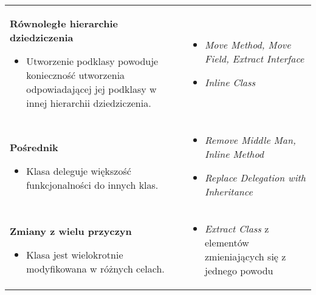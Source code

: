\documentclass[../main.tex]{subfiles}
\begin{document}
\begin{table}[H]
\begin{center}
\begin{tabular}{ p{.35\linewidth} p{.65\linewidth}}
                \cmidrule(r){1-1}\cmidrule(l){2-2}
                \textbf{Równoległe hierarchie dziedziczenia}
                \begin{itemize}
                    \item Utworzenie podklasy powoduje konieczność utworzenia odpowiadającej jej podklasy
                    w innej hierarchii dziedziczenia.
                \end{itemize}
                &
                \begin{itemize}
                    \item \textit{Move Method, Move Field, Extract Interface}
                    \item \textit{Inline Class}
                \end{itemize}
                \\

                \cmidrule(r){1-1}\cmidrule(l){2-2}
                \textbf{Pośrednik}
                \begin{itemize}
                    \item Klasa deleguje większość funkcjonalności do innych klas.
                \end{itemize}
                &
                \begin{itemize}
                    \item \textit{Remove Middle Man, Inline Method}
                    \item \textit{Replace Delegation with Inheritance}
                \end{itemize}
                \\

                \cmidrule(r){1-1}\cmidrule(l){2-2}
                \textbf{Zmiany z wielu przyczyn}
                \begin{itemize}
                    \item Klasa jest wielokrotnie modyfikowana w różnych celach.
                \end{itemize}
                &
                \begin{itemize}
                    \item \textit{Extract Class} z elementów zmieniających się z jednego powodu
                \end{itemize}
                \\



\end{tabular}
\end{center}
\end{table}
\end{document}
